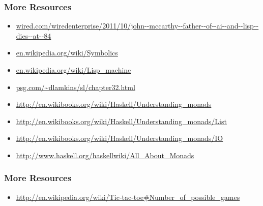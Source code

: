 \documentclass[]{beamer}
\begin{document}
\begin{frame}[fragile]
  \frametitle{More Resources}

  \begin{itemize}    
  \item \url{wired.com/wiredenterprise/2011/10/john--mccarthy--father--of--ai--and--lisp--dies--at--84}
  \item \url{en.wikipedia.org/wiki/Symbolics}
  \item \url{en.wikipedia.org/wiki/Lisp_machine}
  \item \url{psg.com/~dlamkins/sl/chapter32.html}
  \item \url{http://en.wikibooks.org/wiki/Haskell/Understanding_monads}
  \item \url{http://en.wikibooks.org/wiki/Haskell/Understanding_monads/List}
  \item \url{http://en.wikibooks.org/wiki/Haskell/Understanding_monads/IO}
  \item \url{http://www.haskell.org/haskellwiki/All_About_Monads}
  \end{itemize}
\end{frame}

\begin{frame}[fragile]
  \frametitle{More Resources}

  \begin{itemize}    
  \item \url{http://en.wikipedia.org/wiki/Tic-tac-toe#Number_of_possible_games}
  \end{itemize}

\end{frame}
\end{document}
